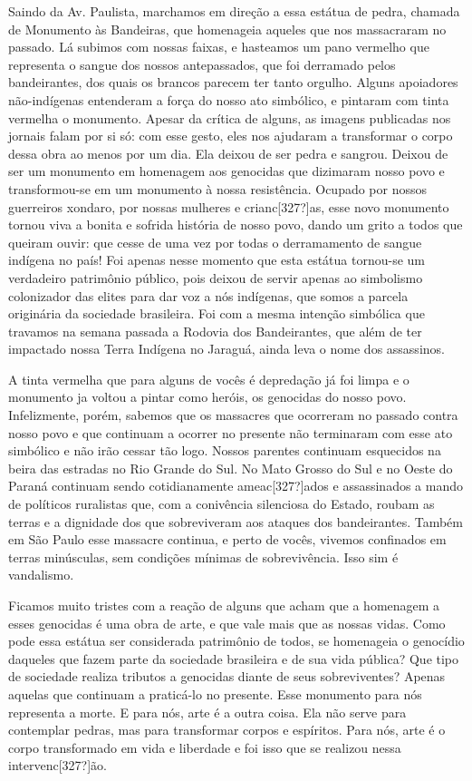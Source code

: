 \documentclass{article}
\begin{document}
Saindo da Av. Paulista, marchamos em dire\c{c}\~ao a essa est\'atua de
pedra, chamada de Monumento \`as Bandeiras, que homenageia aqueles que
nos massacraram no passado. L\'a subimos com nossas faixas, e hasteamos
um pano vermelho que representa o sangue dos nossos antepassados, que
foi derramado pelos bandeirantes, dos quais os brancos parecem ter
tanto orgulho. Alguns apoiadores n\~ao-ind\'igenas entenderam a
for\c{c}a do nosso ato simb\'olico, e pintaram com tinta vermelha o
monumento. Apesar da cr\'itica de alguns, as imagens publicadas nos
jornais falam por si s\'o: com esse gesto, eles nos ajudaram a
transformar o corpo dessa obra ao menos por um dia. Ela deixou de ser
pedra e sangrou. Deixou de ser um monumento em homenagem aos genocidas
que dizimaram nosso povo e transformou-se em um monumento \`a nossa
resist\^encia. Ocupado por nossos guerreiros xondaro, por nossas
mulheres e crianc[327?]as, esse novo monumento tornou viva a bonita e
sofrida hist\'oria de nosso povo, dando um grito a todos que queiram
ouvir: que cesse de uma vez por todas o derramamento de sangue
ind\'igena no pa\'is! Foi apenas nesse momento que esta est\'atua
tornou-se um verdadeiro patrim\^onio p\'ublico, pois deixou de servir
apenas ao simbolismo colonizador das elites para dar voz a n\'os
ind\'igenas, que somos a parcela origin\'aria da sociedade brasileira.
Foi com a mesma inten\c{c}\~ao simb\'olica que travamos na semana
passada a Rodovia dos Bandeirantes, que al\'em de ter impactado nossa
Terra Ind\'igena no Jaragu\'a, ainda leva o nome dos assassinos.

A tinta vermelha que para alguns de voc\^es \'e depreda\c{c}\~ao j\'a
foi limpa e o monumento ja voltou a pintar como her\'ois, os genocidas
do nosso povo. Infelizmente, por\'em, sabemos que os massacres que
ocorreram no passado contra nosso povo e que continuam a ocorrer no
presente n\~ao terminaram com esse ato simb\'{o}lico e n\~ao ir\~ao
cessar t\~ao logo. Nossos parentes continuam esquecidos na beira das
estradas no Rio Grande do Sul. No Mato Grosso do Sul e no Oeste do
Paran\'a continuam sendo cotidianamente ameac[327?]ados e assassinados
a mando de pol\'iticos ruralistas que, com a coniv\^encia silenciosa do
Estado, roubam as terras e a dignidade dos que sobreviveram aos ataques
dos bandeirantes. Tamb\'em em S\~ao Paulo esse massacre continua, e
perto de voc\^es, vivemos confinados em terras min\'usculas, sem
condi\c{c}\~oes m\'inimas de sobreviv\^encia. Isso sim \'e vandalismo.

Ficamos muito tristes com a rea\c{c}\~ao de alguns que acham que a
homenagem a esses genocidas \'e uma obra de arte, e que vale mais que
as nossas vidas. Como pode essa est\'atua ser considerada patrim\^onio
de todos, se homenageia o genoc\'idio daqueles que fazem parte da
sociedade brasileira e de sua vida p\'ublica? Que tipo de sociedade
realiza tributos a genocidas diante de seus sobreviventes? Apenas
aquelas que continuam a pratic\'a-lo no presente. Esse monumento para
n\'os representa a morte. E para n\'os, arte \'e a outra coisa. Ela
n\~ao serve para contemplar pedras, mas para transformar corpos e
esp\'iritos. Para n\'os, arte \'e o corpo transformado em vida e
liberdade e foi isso que se realizou nessa intervenc[327?]\~{a}o.
\end{document}
